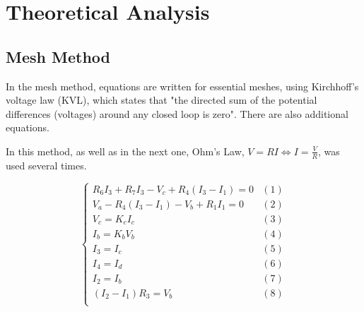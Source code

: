 \section{Theoretical Analysis}
\label{sec:analysis}
\subsection{Mesh Method}
\par
In the mesh method, equations are written for essential meshes, using Kirchhoff's voltage law (KVL), which states that "the directed sum of the potential differences (voltages) around any closed loop is zero". There are also additional equations.

\par
In this method, as well as in the next one, Ohm's Law, $V=RI \Leftrightarrow I = \frac{V}{R}$, was used several times.


\begin{equation}
\begin{cases}
R_6 I_3 + R_7 I_3 - V_c + R_4(I_3-I_1) = 0 & \mbox{$(1)$}\\
V_a - R_4 (I_3-I_1) - V_b + R_1 I_1 = 0 & \mbox{$(2)$}\\
V_c = K_c I_c & \mbox{$(3)$} \\
I_b = K_b V_b & \mbox{$(4)$} \\
I_3 = I_c & \mbox{$(5)$}\\
I_4 = I_d & \mbox{$(6)$}\\
I_2 = I_b & \mbox{$(7)$}\\
(I_2-I_1) R_3 = V_b & \mbox{$(8)$}\\
\end{cases}
\end{equation}


